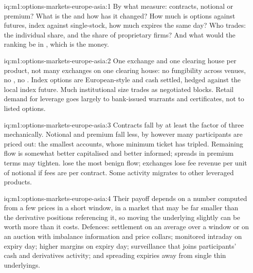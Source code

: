 \begin{solution}{iq:m1:options-markets-europe-asia:1}
By what measure: contracts, notional or premium? What is the  and
how has it changed? How much is options against futures, index against
single-stock, how much expires the same day? Who trades: the individual
share, and the share of proprietary firms? And what would the ranking be in
, which is the money.
\end{solution}

\begin{solution}{iq:m1:options-markets-europe-asia:2}
One exchange and one clearing house per product, not many exchanges on one
clearing house: no fungibility across venues, no ,
no . Index options are European-style and cash
settled, hedged against the local index future. Much institutional size
trades as negotiated blocks. Retail demand for leverage goes largely to
bank-issued warrants and certificates, not to listed options.
\end{solution}

\begin{solution}{iq:m1:options-markets-europe-asia:3}
Contracts fall by at least the factor of three mechanically. Notional and
premium fall less, by however many participants are priced out: the smallest
accounts, whose minimum ticket has tripled. Remaining flow is somewhat
better capitalised and better informed; spreads in premium terms may
tighten.  lose the most benign flow; exchanges lose fee
revenue per unit of notional if fees are per contract. Some activity
migrates to other leveraged products.
\end{solution}

\begin{solution}{iq:m1:options-markets-europe-asia:4}
Their payoff depends on a number computed from a few prices in a short
window, in a market that may be far smaller than the derivative positions
referencing it, so moving the underlying slightly can be worth more than it
costs. Defences: settlement on an average over a window or on an auction
with imbalance information and price collars;  monitored
intraday on expiry day; higher margins on expiry day; surveillance that
joins participants' cash and derivatives activity; and spreading expiries
away from single thin underlyings.
\end{solution}

